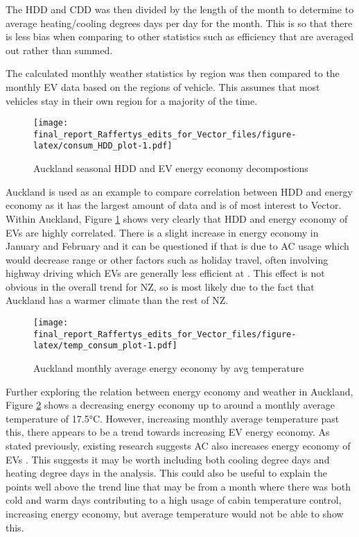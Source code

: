 \documentclass[
]{article}
\begin{document}
The HDD and CDD was then divided by the length of the month to determine
to average heating/cooling degrees days per day for the month. This is
so that there is less bias when comparing to other statistics such as
efficiency that are averaged out rather than summed.

The calculated monthly weather statistics by region was then compared to
the monthly EV data based on the regions of vehicle. This assumes that
most vehicles stay in their own region for a majority of the time.

\begin{figure}
\centering
\texttt{[image: final\_report\_Raffertys\_edits\_for\_Vector\_files/figure-latex/consum\_HDD\_plot-1.pdf]}
\caption{Auckland seasonal HDD and EV energy economy
decompostions\label{fig:consum_HDD_plot}}
\end{figure}

Auckland is used as an example to compare correlation between HDD and
energy economy as it has the largest amount of data and is of most
interest to Vector. Within Auckland, Figure \ref{fig:consum_HDD_plot}
shows very clearly that HDD and energy economy of EVs are highly
correlated. There is a slight increase in energy economy in January and
February and it can be questioned if that is due to AC usage which would
decrease range \cite{ev_range} or other factors such as holiday travel,
often involving highway driving which EVs are generally less efficient
at \cite{ev_highway}. This effect is not obvious in the overall trend
for NZ, so is most likely due to the fact that Auckland has a warmer
climate than the rest of NZ.

\begin{figure}
\centering
\texttt{[image: final\_report\_Raffertys\_edits\_for\_Vector\_files/figure-latex/temp\_consum\_plot-1.pdf]}
\caption{Auckland monthly average energy economy by avg
temperature\label{fig:temp_consum_plot}}
\end{figure}

Further exploring the relation between energy economy and weather in
Auckland, Figure \ref{fig:temp_consum_plot} shows a decreasing energy
economy up to around a monthly average temperature of 17.5°C. However,
increasing monthly average temperature past this, there appears to be a
trend towards increasing EV energy economy. As stated previously,
existing research suggests AC also increases energy economy of EVs
\cite{ev_range}. This suggests it may be worth including both cooling
degree days and heating degree days in the analysis. This could also be
useful to explain the points well above the trend line that may be from
a month where there was both cold and warm days contributing to a high
usage of cabin temperature control, increasing energy economy, but
average temperature would not be able to show this.
\end{document}
